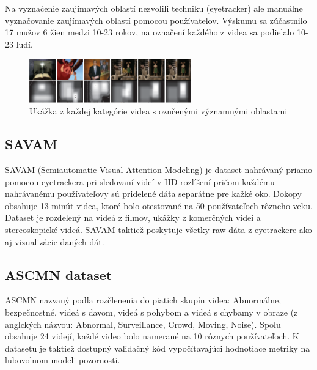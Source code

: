Na vyznačenie zaujímavých oblastí nezvolili techniku (eyetracker) ale manuálne vyznačovanie zaujímavých oblastí pomocou používateľov.
Výskumu sa zúčastnilo 17 mužov 6 žien medzi 10-23 rokov, na označení každého z videa sa podielalo 10-23 ludí.

\begin{figure}[H]
 \centering
 \includegraphics[width=7cm]{pics/rsd.png}
 \caption{Ukážka z každej kategórie videa s oznčenými významnými oblastami}
\end{figure}
\vspace{10mm}

\subsection{SAVAM}
SAVAM (Semiautomatic Visual-Attention Modeling) je dataset nahrávaný priamo pomocou eyetrackera pri sledovaní videí v HD rozlíšení pričom každému nahrávanému používateľovy sú pridelené dáta separátne pre kažké oko.
Dokopy obsahuje 13 minút videa, ktoré bolo otestované na 50 používateľoch rôzneho veku.
Dataset je rozdelený na videá z filmov, ukážky z komerčných videí a stereoskopické videá.
SAVAM taktiež poskytuje všetky raw dáta z eyetrackere ako aj vizualizácie daných dát\cite{savam}.

\subsection{ASCMN dataset}
ASCMN nazvaný podľa rozčlenenia do piatich skupín videa: Abnormálne, bezpečnostné, videá s davom, videá s pohybom a videá s chybamy v obraze (z anglckých názvou: Abnormal, Surveillance, Crowd, Moving, Noise).
Spolu obsahuje 24 videjí, každé video bolo namerané na 10 rôznych používateľoch.
K datasetu je taktiež dostupný validačný kód\cite{accv} vypočítavajúci hodnotiace metriky na lubovolnom modeli pozornosti.

